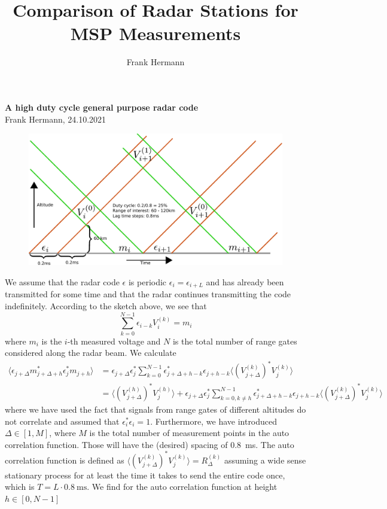 \documentclass[18pt,a4paper]{extarticle}
\author{Frank Hermann}
\title{Comparison of Radar Stations for MSP Measurements}
\begin{document}
\begin{center}
	\textbf{\Large{A high duty cycle general purpose radar code}}\\
	\small{Frank Hermann, 24.10.2021}
\end{center}
\begin{figure}[h!]
	\centering
	\includegraphics[width=0.7\linewidth]{code_diagram.pdf}
\end{figure}
We assume that the radar code $\epsilon$ is periodic $\epsilon_i = \epsilon_{i + L}$ and has already been transmitted for some time and that the radar continues transmitting the code indefinitely.
According to the sketch above, we see that
$$
\sum_{k=0}^{N-1} \epsilon_{i-k} V^{(k)}_i = m_i
$$
where $m_i$ is the $i$-th measured voltage and $N$ is the total number of range gates considered along the radar beam.
We calculate
\begin{align*}
\langle \epsilon_{j + \Delta}m_{j + \Delta + h}^* \epsilon_j^*m_{j+h}\rangle &= \epsilon_{j + \Delta}\epsilon_j^* \sum_{k=0}^{N-1} \epsilon_{j+\Delta+h-k}^*\epsilon_{j+h-k} \langle (V^{(k)}_{j + \Delta})^*V^{(k)}_j \rangle\\
&= \langle (V_{j+\Delta}^{(h)})^* V_j^{(h)} \rangle + \epsilon_{j + \Delta}\epsilon_j^*\sum_{k=0,k\neq h}^{N-1} \epsilon_{j+\Delta+h-k}^*\epsilon_{j+h-k} \langle (V^{(k)}_{j + \Delta})^*V^{(k)}_j \rangle
\end{align*}
where we have used the fact that signals from range gates of different altitudes do not correlate and assumed that $\epsilon_i^*\epsilon_i = 1$.
Furthermore, we have introduced $\Delta \in [1, M]$, where $M$ is the total number of measurement points in the auto correlation function.
Those will have the (desired) spacing of \SI{0.8}{\ms}.
The auto correlation function is defined as $\langle (V_{j+\Delta}^{(k)})^* V_j^{(k)} \rangle = R^{(k)}_\Delta$ assuming a wide sense stationary process for at least the time it takes to send the entire code once, which is $T = L\cdot\SI{0.8}{\ms}$.
We find for the auto correlation function at height $h \in [0, N-1]$
\end{document}
